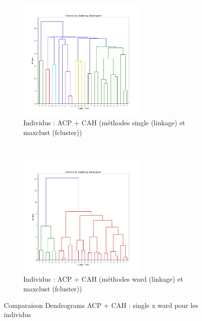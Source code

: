     \begin{figure}[!htb]
        \begin{subfigure}[b]{1.0\textwidth}
            \centering
            \includegraphics[width=0.7\textwidth]{img/mixte_acp_cah/Dendrogram_individus_'single'_'maxclust'.jpg}
            \caption{Individus : ACP + CAH (méthodes single (linkage) et maxclust (fcluster))}
            \label{Label_Dendrogram_individus_'single'_'maxclust'.jpg}
        \end{subfigure}
        \\
        \begin{subfigure}[b]{1.0\textwidth}
            \centering
            \includegraphics[width=0.7\textwidth]{img/mixte_acp_cah/Dendrogram_individus_'ward'_'maxclust'.jpg}
            \caption{Individus : ACP + CAH (méthodes ward (linkage) et maxclust (fcluster))}
            \label{Label_Dendrogram_individus_'ward'_'maxclust'.jpg}
        \end{subfigure}
        \caption{Comparaison Dendrograms ACP + CAH : single x ward pour les individus}
    \end{figure}
    
